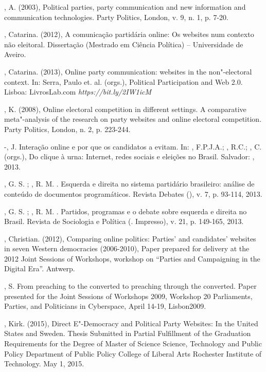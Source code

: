 \begin{Parskip}
, A. (2003), Political parties, party communication and new
information and communication technologies. Party Politics, London, v.
9, n. 1, p. 7-20.

, Catarina. (2012), A comunicação partidária online: Os websites
num contexto não eleitoral. Dissertação (Mestrado em Ciência Política)
-- Universidade de Aveiro.

, Catarina. (2013), Online party communication: websites in the
non"-electoral context. In: Serra, Paulo et. al. (orgs.), Political
Participation and Web 2.0. Lisboa: LivrosLab.com
\emph{https://bit.ly/2IW1icM}

, K. (2008), Online electoral competition in different
settings. A comparative meta"-analysis of the research on party websites
and online electoral competition. Party Politics, London, n. 2, p.
223-244.

-, J. Interação online e por que os candidatos a evitam.
In: , F.P.J.A.; , R.C.; , C. (orgs.), Do clique à
urna: Internet, redes sociais e eleições no Brasil. Salvador: ,
2013.

, G. S. ; , R. M. . Esquerda e direita no sistema
partidário brasileiro: análise de conteúdo de documentos programáticos.
Revista Debates (), v. 7, p. 93-114, 2013.

, G. S. ; , R. M. . Partidos, programas e o debate sobre
esquerda e direita no Brasil. Revista de Sociologia e Política (.
Impresso), v. 21, p. 149-165, 2013.

, Christian. (2012), Comparing online politics: Parties' and
candidates' websites in seven Western democracies (2006-2010), Paper
prepared for delivery at the  2012 Joint Sessions of Workshops,
workshop on ``Parties and Campaigning in the Digital Era''. Antwerp.

, S. From preaching to the converted to preaching through the
converted. Paper presented for the  Joint Sessions of Workshops
2009, Workshop 20 Parliaments, Parties, and Politicians in Cyberspace,
April 14-19, Lisbon2009.

, Kirk. (2015), Direct E"-Democracy and Political Party Websites:
In the United States and Sweden. Thesis Submitted in Partial Fulfillment
of the Graduation Requirements for the Degree of Master of Science
Science, Technology and Public Policy Department of Public Policy
College of Liberal Arts Rochester Institute of Technology. May 1, 2015.


\end{Parskip}
